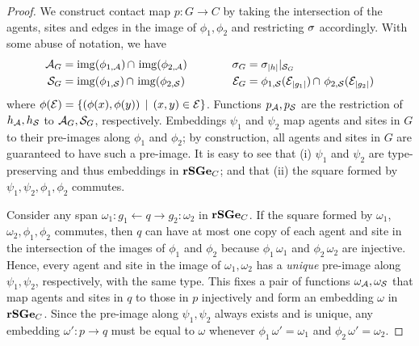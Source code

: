 \begin{proof}
  We construct contact map $p: G \to C$ by taking the intersection
  of the agents, sites and edges in the image of $\phi_1,\phi_2$
  and restricting $\sigma$ accordingly.
  With some abuse of notation, we have
  \begin{alignat*}{3}
    \mathcal{A}_G & {}= \operatorname*{img}(\phi_{1,\mathcal{A}}) \operatorname*{\cap}{}
                    \operatorname*{img}(\phi_{2,\mathcal{A}}) \quad \quad \quad &
    \sigma_G & {}= {\sigma_{\left|h\right|}}|_{\mathcal{S}_G} \\
    \mathcal{S}_G & {}= \operatorname*{img}(\phi_{1,\mathcal{S}}) \operatorname*{\cap}{}
                   \operatorname*{img}(\phi_{2,\mathcal{S}}) &
    \mathcal{E}_G & {}= \phi_{1,\mathcal{S}}(\mathcal{E}_{\left|g_1\right|}) \operatorname*{\cap}{}
                \, \phi_{2,\mathcal{S}}(\mathcal{E}_{\left|g_2\right|})
  \end{alignat*}
  where $\phi(\mathcal{E}) =
  \left\{ \left(\phi(x),\phi(y)\right) \; | \; \left(x,y\right) \in \mathcal{E} \right\}$.
  Functions $p_{\mathcal{A}},p_{\mathcal{S}}$ are the restriction of
  $h_{\mathcal{A}},h_{\mathcal{S}}$ to $\mathcal{A}_G,\mathcal{S}_G$, respectively.
  Embeddings $\psi_1$ and $\psi_2$ map agents and sites
  in $G$ to their pre-images along $\phi_1$ and $\phi_2$;
  by construction, all agents and sites in $G$
  are guaranteed to have such a pre-image.
  It is easy to see that
  (i) $\psi_1$ and $\psi_2$ are type-preserving
  and thus embeddings in $\mathbf{rSGe}_C$; and that
  (ii) the square formed by $\psi_1,\psi_2,\phi_1,\phi_2$ commutes.

  Consider any span $\omega_1: g_1 \gets q \to g_2 :\omega_2$ in $\mathbf{rSGe}_C$.
  If the square formed by $\omega_1$, $\omega_2,\phi_1,\phi_2$ commutes,
  then $q$ can have at most one copy of each agent and site
  in the intersection of the images of $\phi_1$ and $\phi_2$
  because $\phi_1\,\omega_1$ and $\phi_2\,\omega_2$ are injective.
  Hence, every agent and site in the image of $\omega_1,\omega_2$
  has a \emph{unique} pre-image along $\psi_1,\psi_2$, respectively,
  with the same type.
  This fixes a pair of functions $\omega_{\mathcal{A}},\omega_{\mathcal{S}}$
  that map agents and sites in $q$ to those in $p$ injectively
  and form an embedding $\omega$ in $\mathbf{rSGe}_C$.
  Since the pre-image along $\psi_1,\psi_2$ always exists and is unique,
  any embedding $\omega': p \to q$ must be equal to $\omega$
  whenever $\phi_1\,\omega' = \omega_1$ and
  $\phi_2\,\omega' = \omega_2$.
\end{proof}

